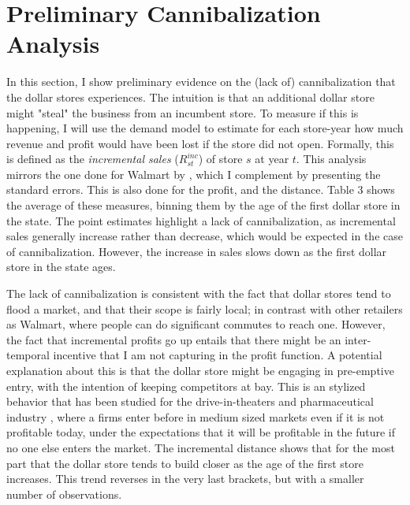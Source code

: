\documentclass[11.5pt]{article}
\begin{document}

\section{Preliminary Cannibalization Analysis}

In this section, I show preliminary evidence on the (lack of) cannibalization that the dollar stores experiences. The intuition is that an additional dollar store might "steal" the business from an incumbent store. To measure if this is happening, I will use the demand model to estimate for each store-year how much revenue and profit would have been lost if the store did not open. Formally, this is defined as the \textit{incremental sales} ($R^{inc}_{st}$) of store $s$ at year $t$. This analysis mirrors the one done for Walmart by \citeauthor{holmes2011diffusion} \citeyear{holmes2011diffusion}, which I complement by presenting the standard errors. This is also done for the profit, and the distance. Table 3 shows the average of these measures, binning them by the age of the first dollar store in the state. The point estimates highlight a lack of cannibalization, as incremental sales generally increase rather than decrease, which would be expected in the case of cannibalization. However, the increase in sales slows down as the first dollar store in the state ages.


The lack of cannibalization is consistent with the fact that dollar stores tend to flood a market, and that their scope is fairly local; in contrast with other retailers as Walmart, where people can do significant commutes to reach one. However, the fact that incremental profits go up entails that there might be an inter-temporal incentive that I am not capturing in the profit function. A potential explanation about this is that the dollar store might be engaging in pre-emptive entry, with the intention of keeping competitors at bay. This is an stylized behavior that has been studied for the drive-in-theaters and pharmaceutical industry \cite{gil2021preemptive,ellison2011strategic}, where a firms enter before in medium sized markets even if it is not profitable today, under the expectations that it will be profitable in the future if no one else enters the market.  The incremental distance shows that for the most part that the dollar store tends to build closer as the age of the first store increases. This trend reverses in the very last brackets, but with a smaller number of observations. 
\end{document}
